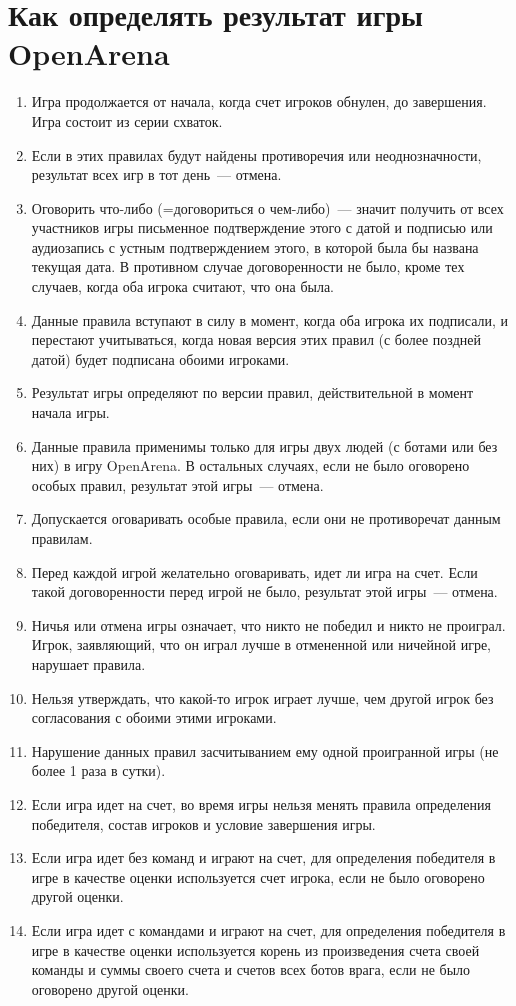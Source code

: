 \documentclass[a4paper,titlepage,12pt]{article}
\begin{document}
{\center\section*{Как определять результат игры OpenArena}}

\thispagestyle{empty}

\begin{enumerate}
\item Игра продолжается от начала, когда счет игроков обнулен,
    до завершения.
    Игра состоит из серии схваток.
\item Если в этих правилах будут найдены противоречия или неоднозначности,
    результат всех игр в тот день~--- отмена.
\item Оговорить что-либо (=договориться о чем-либо)~---
    значит получить от всех участников игры
    письменное подтверждение этого с датой и подписью
    или аудиозапись с устным подтверждением этого,
    в которой была бы названа текущая дата.
    В противном случае договоренности не было,
    кроме тех случаев, когда оба игрока считают, что она была.
\item Данные правила вступают в силу в момент, когда оба игрока
    их подписали, и перестают учитываться, когда новая версия этих правил
    (с более поздней датой) будет подписана обоими игроками.
\item Результат игры определяют по версии правил, действительной в момент
    начала игры.
\item Данные правила применимы только для игры двух людей
    (с ботами или без них) в игру OpenArena.
    В остальных случаях, если не было оговорено особых правил,
    результат этой игры~--- отмена.
\item Допускается оговаривать особые правила, если они не противоречат
    данным правилам.
\item Перед каждой игрой желательно оговаривать, идет ли игра на счет.
    Если такой договоренности перед игрой не было,
    результат этой игры~--- отмена.
\item Ничья или отмена игры означает, что никто не победил и никто не проиграл.
    Игрок, заявляющий, что он играл лучше в отмененной или ничейной игре,
    нарушает правила.
\item Нельзя утверждать, что какой-то игрок играет лучше, чем другой игрок
    без согласования с обоими этими игроками.
\item Нарушение данных правил засчитыванием ему одной проигранной игры
    (не более 1 раза в сутки).
\item Если игра идет на счет, во время игры нельзя менять
    правила определения победителя,
    состав игроков и условие завершения игры.
\item Если игра идет без команд и играют на счет, для определения
    победителя в игре в качестве оценки используется счет игрока,
    если не было оговорено другой оценки.
\item Если игра идет с командами и играют на счет, для определения
    победителя в игре в качестве оценки используется корень из
    произведения счета своей команды и суммы своего счета и счетов
    всех ботов врага, если не было оговорено другой оценки.


\end{enumerate}
\end{document}
